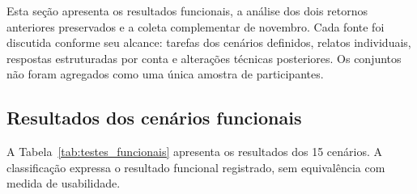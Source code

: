 \documentclass{UNESC}
\begin{document}
Esta seção apresenta os resultados funcionais, a análise dos dois retornos anteriores preservados e a coleta complementar de novembro. Cada fonte foi discutida conforme seu alcance: tarefas dos cenários definidos, relatos individuais, respostas estruturadas por conta e alterações técnicas posteriores. Os conjuntos não foram agregados como uma única amostra de participantes.

\subsection{Resultados dos cenários funcionais}

A Tabela~\ref{tab:testes_funcionais} apresenta os resultados dos 15 cenários. A classificação expressa o resultado funcional registrado, sem equivalência com medida de usabilidade.
\end{document}
